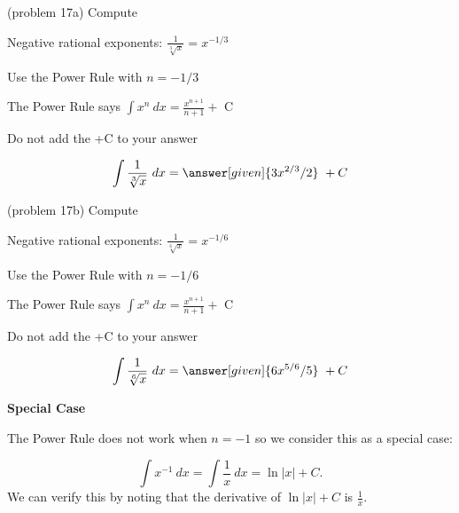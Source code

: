 \documentclass{ximera}
\begin{document}
\begin{problem}(problem 17a)
Compute 

\begin{hint}
Negative rational exponents: $\frac{1}{\sqrt[3]x} = x^{-1/3}$
\end{hint}
\begin{hint}
Use the Power Rule with $n=-1/3$
\end{hint}
\begin{hint}
The Power Rule says $\int x^n \ dx = \frac{x^{n+1}}{n+1} +$ C
\end{hint}
\begin{hint}
\begin{center}
Do not add the +C to your answer
\end{center}
\end{hint}

\[
\int \frac{1}{\sqrt[3]x} \ dx =
\answer[given]{3x^{2/3} /2} \ + C
\]
\end{problem}



\begin{problem}(problem 17b)
Compute 

\begin{hint}
Negative rational exponents: $\frac{1}{\sqrt[6]x} = x^{-1/6}$
\end{hint}
\begin{hint}
Use the Power Rule with $n=-1/6$
\end{hint}
\begin{hint}
The Power Rule says $\int x^n \ dx = \frac{x^{n+1}}{n+1} +$ C
\end{hint}
\begin{hint}
\begin{center}
Do not add the +C to your answer
\end{center}
\end{hint}

\[
\int \frac{1}{\sqrt[6]x} \ dx =
\answer[given]{6x^{5/6} /5} \ + C
\]
\end{problem}



\begin{center}
\textbf{Special Case}
\end{center}

The Power Rule does not work when $n = -1$ so we consider this as a special case:

\begin{example}[example 18]
\[\int x^{-1} \ dx = \int \frac{1}{x}  \ dx = \ln |x| +C.\]
We can verify this by noting that the derivative of $\ln|x| + C$ is $\displaystyle{\frac{1}{x}}$.
\end{example}
\end{document}
